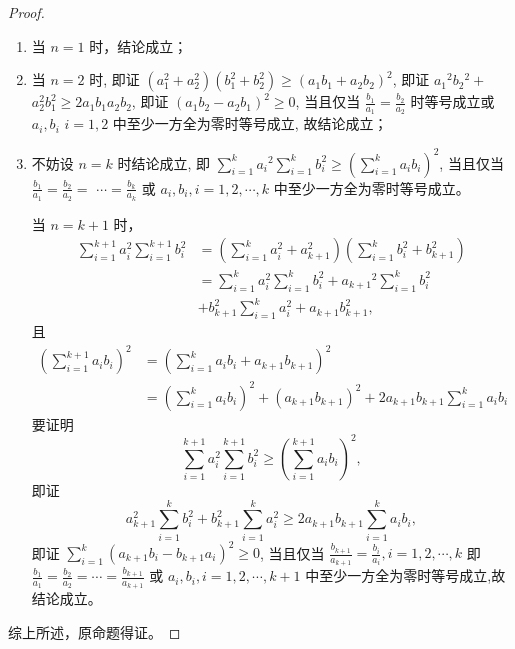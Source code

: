 \begin{proof}
  \begin{enumerate}
    \item 当 $n=1$ 时，结论成立；
    \item 当 $n=2$ 时, 即证 $\left(a_{1}^{2}+a_{2}^{2}\right)\left(b_{1}^{2}+b_{2}^{2}\right) \geq\left(a_{1} b_{1}+a_{2} b_{2}\right)^{2}$, 即证 $a_{1}{ }^{2} b_{2}{ }^{2}+$ $a_{2}^{2} b_{1}^{2} \geq 2 a_{1} b_{1} a_{2} b_{2}$, 即证 $\left(a_{1} b_{2}-a_{2} b_{1}\right)^{2} \geq 0$, 当且仅当 $\frac{b_{1}}{a_{1}}=\frac{b_{2}}{a_{2}}$ 时等号成立或 $a_{i}, b_{i}$ $i=1,2$ 中至少一方全为零时等号成立, 故结论成立；
    \item 不妨设 $n=k$ 时结论成立, 即 $\sum_{i=1}^{k} a_{i}{ }^{2} \sum_{i=1}^{k} b_{i}^{2} \geq\left(\sum_{i=1}^{k} a_{i} b_{i}\right)^{2}$, 当且仅当 $\frac{b_{1}}{a_{1}}=\frac{b_{2}}{a_{2}}=$ $\cdots=\frac{b_{k}}{a_{k}}$ 或 $a_{i}, b_{i}, i=1,2, \cdots, k$ 中至少一方全为零时等号成立。
    
    当 $n=k+1$ 时，
    \begin{align*}
      \sum_{i=1}^{k+1} a_{i}^{2} \sum_{i=1}^{k+1} b_{i}^{2} &=\left(\sum_{i=1}^{k} a_{i}^{2}+a_{k+1}^{2}\right)\left(\sum_{i=1}^{k} b_{i}^{2}+b_{k+1}^{2}\right) \\
      &=\sum_{i=1}^{k} a_{i}^{2} \sum_{i=1}^{k} b_{i}^{2}+a_{k+1}{ }^{2} \sum_{i=1}^{k} b_{i}^{2} \\
      &+b_{k+1}^{2} \sum_{i=1}^{k} a_{i}^{2}+a_{k+1} b_{k+1}^{2},
    \end{align*}且
    \begin{align*}
      \left(\sum_{i=1}^{k+1} a_{i} b_{i}\right)^{2} &=\left(\sum_{i=1}^{k} a_{i} b_{i}+a_{k+1} b_{k+1}\right)^{2} \\
      &=\left(\sum_{i=1}^{k} a_{i} b_{i}\right)^{2}+\left(a_{k+1} b_{k+1}\right)^{2}+2 a_{k+1} b_{k+1} \sum_{i=1}^{k} a_{i} b_{i}
    \end{align*}
    要证明 \[\sum_{i=1}^{k+1} a_{i}^{2} \sum_{i=1}^{k+1} b_{i}^{2} \geq\left(\sum_{i=1}^{k+1} a_{i} b_{i}\right)^{2},\]
    即证
    \[
      a_{k+1}^2 \sum_{i=1}^{k} b_{i}^{2}+b_{k+1}^{2} \sum_{i=1}^{k} a_{i}^{2} \geq 2 a_{k+1} b_{k+1} \sum_{i=1}^{k} a_{i} b_{i},
    \]
    即证 $\sum_{i=1}^{k}\left(a_{k+1} b_{i}-b_{k+1} a_{i}\right)^{2} \geq 0$, 当且仅当 $\frac{b_{k+1}}{a_{k+1}}=\frac{b_{i}}{a_{i}}, i=1,2, \cdots, k$ 即 $\frac{b_{1}}{a_{1}}=\frac{b_{2}}{a_{2}}=\cdots=\frac{b_{k+1}}{a_{k+1}}$ 或 $a_{i}, b_{i}, i=1,2, \cdots, k+1$ 中至少一方全为零时等号成立,故结论成立。
  \end{enumerate}

  综上所述，原命题得证。
\end{proof}



